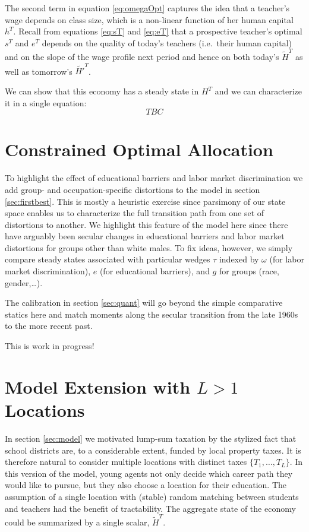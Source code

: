 \documentclass[onehalfspacing,11pt]{article}
\begin{document}
The second term in equation \eqref{eq:omegaOpt} captures the idea that a teacher's wage depends on class size, which is a non-linear function of her human capital $h^T$. Recall from equations \eqref{eq:sT} and \eqref{eq:eT} that a prospective teacher's optimal $s^T$ and $e^T$ depends on the quality of today's teachers (i.e.~their human capital) and on the slope of the wage profile next period and hence on both today's $ \widetilde{H}^{T}$ as well as tomorrow's $\widetilde{H'}^{T}$.

We can show that this economy has a steady state in $H^T$ and we can characterize it in a single equation:
\begin{equation}
\label{ }
TBC
\end{equation}
\section{Constrained Optimal Allocation}
To highlight the effect of educational barriers and labor market discrimination we add group- and occupation-specific distortions to the model in section \ref{sec:firstbest}. This is mostly a heuristic exercise since parsimony of our state space enables us to characterize the full transition path from one set of distortions to another. We highlight this feature of the model here since there have arguably been secular changes in educational barriers and labor market distortions for groups other than white males. To fix ideas, however, we simply compare steady states associated with particular wedges $\tau$ indexed by $\omega$ (for labor market discrimination), $e$ (for educational barriers), and $g$ for groups (race, gender,\ldots).

The calibration in section \ref{sec:quant} will go beyond the simple comparative statics here and match moments along the secular transition from the late 1960s to the more recent past.

{\sc This is work in progress!}
\section{Model Extension with $L > 1$ Locations}
In section \ref{sec:model} we motivated lump-sum taxation by the stylized fact that school districts are, to a considerable extent, funded by local property taxes. It is therefore natural to consider multiple locations with distinct taxes $\{T_1,\ldots,T_L\}$. In this version of the model, young agents not only decide which career path they would like to pursue, but they also choose a location for their education. %
The assumption of a single location with (stable) random matching between students and teachers had the benefit of tractability. The aggregate state of the economy could be summarized by a single scalar, $ \widetilde{H}^{T}$.
\end{document}
